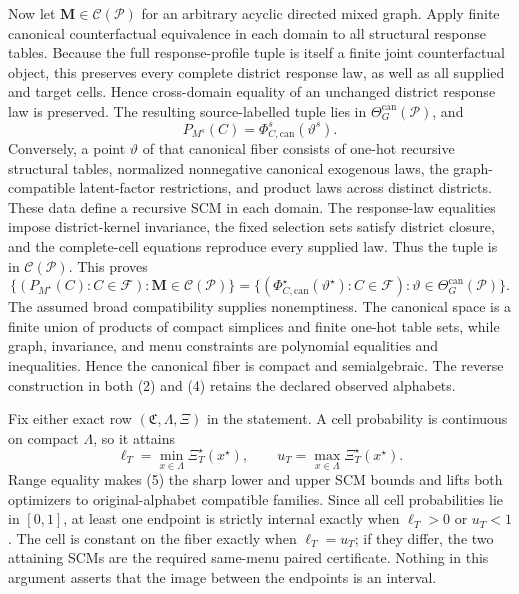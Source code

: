 Now let \(\mathbf M\in\mathcal C(\mathcal P)\) for an arbitrary acyclic directed mixed graph. Apply finite canonical counterfactual equivalence in each domain to all structural response tables. Because the full response-profile tuple is itself a finite joint counterfactual object, this preserves every complete district response law, as well as all supplied and target cells. Hence cross-domain equality of an unchanged district response law is preserved. The resulting source-labelled tuple lies in \(\Theta_G^{\mathrm{can}}(\mathcal P)\), and
\[
P_{M^s}(C)=\Phi_{C,\mathrm{can}}^s(\vartheta^s).\tag{3}
\]
Conversely, a point \(\vartheta\) of that canonical fiber consists of one-hot recursive structural tables, normalized nonnegative canonical exogenous laws, the graph-compatible latent-factor restrictions, and product laws across distinct districts. These data define a recursive SCM in each domain. The response-law equalities impose district-kernel invariance, the fixed selection sets satisfy district closure, and the complete-cell equations reproduce every supplied law. Thus the tuple is in \(\mathcal C(\mathcal P)\). This proves
\[
\{(P_{M^\star}(C):C\in\mathcal F):\mathbf M\in\mathcal C(\mathcal P)\}
=\{(\Phi_{C,\mathrm{can}}^\star(\vartheta^\star):C\in\mathcal F):\vartheta\in\Theta_G^{\mathrm{can}}(\mathcal P)\}.\tag{4}
\]
The assumed broad compatibility supplies nonemptiness. The canonical space is a finite union of products of compact simplices and finite one-hot table sets, while graph, invariance, and menu constraints are polynomial equalities and inequalities. Hence the canonical fiber is compact and semialgebraic. The reverse construction in both (2) and (4) retains the declared observed alphabets.

Fix either exact row \((\mathfrak C,\Lambda,\Xi)\) in the statement. A cell probability is continuous on compact \(\Lambda\), so it attains
\[
\ell_T=\min_{x\in\Lambda}\Xi_T^\star(x^\star),\qquad
u_T=\max_{x\in\Lambda}\Xi_T^\star(x^\star).\tag{5}
\]
Range equality makes (5) the sharp lower and upper SCM bounds and lifts both optimizers to original-alphabet compatible families. Since all cell probabilities lie in \([0,1]\), at least one endpoint is strictly internal exactly when \(\ell_T>0\) or \(u_T<1\). The cell is constant on the fiber exactly when \(\ell_T=u_T\); if they differ, the two attaining SCMs are the required same-menu paired certificate. Nothing in this argument asserts that the image between the endpoints is an interval.

